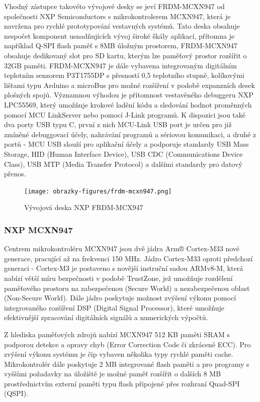 Vhodný zástupce takovéto vývojové desky se jeví FRDM-MCXN947 od společnosti NXP Semiconductors s mikrokontrolerem MCXN947, která je navržena pro rychlé prototypování vestavných systémů. Tato deska obsahuje nespočet komponent usnadňujících vývoj široké škály aplikací, přítomna je například Q-SPI flash paměť s 8MB úložným prostorem, FRDM-MCXN947 obsahuje dedikovaný slot pro SD kartu, kterým lze paměťový prostor rozšířit o 32GB paměti. FRDM-MCXN947 je dále vybavena integrovaným digitálním teplotním senzorem P3T1755DP s přesností 0,5 teplotního stupně, kolíkovými lištami typu Arduino a microBus pro možné rozšíření v podobě expanzních desek plošných spojů. Významnou výhodou je přítomnost vestavěného debuggeru NXP LPC55569, který umožňuje krokové ladění kódu a sledování hodnot proměnných pomocí MCU LinkServer nebo pomocí J-Link programů. K dispozici jsou také dva porty USB typu C, první z nich MCU-Link USB port je určen pro již zmíněné debuggovací účely, nahrávání programů a sériovou komunikaci, a druhé z portů - MCU USB slouží pro aplikační účely a podporuje standardy USB Mass Storage, HID (Human Interface Device), USB CDC (Communications Device Class), USB MTP (Media Transfer Protocol) a dalšími standardy pro datový přenos. \cite{nxp_MCX_Nx4x_Reference_Manual, nxp_FRDM_MCXN947_getting_started}

\begin{figure}[h]
    \centering
    \texttt{[image: obrazky-figures/frdm-mcxn947.png]}
    
    \caption{Vývojová deska NXP FRDM-MCX947 \cite{nxp_FRDM_MCXN947_getting_started}}
    \label{fig:keelog-airdrive-serial-datalogger}
\end{figure}

\subsubsection{NXP MCXN947}
Centrem mikrokontroléru MCXN947 jsou dvě jádra Arm® Cortex-M33 nové generace, pracující až na frekvenci 150 MHz. Jádro Cortex-M33 oproti předchozí generaci - Cortex-M3 je postaveno s novější instruční sadou ARMv8-M, která nabízí větší míru bezpečnosti v podobě TrustZone, jež umožňuje rozdělení paměťového prostoru na zabezpečenou (Secure World) a nezabezpečenou oblast (Non-Secure World). Dále jádro poskytuje možnost zvýšení výkonu pomocí integrovaného rozšíření DSP (Digital Signal Processor), které umožňuje efektivnější zpracování digitálních signálů a numerických výpočtů. \cite{nxp_MCX_Nx4x_Reference_Manual}

Z hlediska paměťových zdrojů nabízí MCXN947 512 KB paměti SRAM s podporou detekce a opravy chyb (Error Correction Code či zkráceně ECC). Pro zvýšení výkonu systému je čip vybaven několika typy rychlé paměti cache. Mikrokontrolér dále poskytuje 2 MB integrované flash paměti a pro programy s vyššími požadavky na úložiště je možné paměť rozšířit o dalších 8 MB prostřednictvím externí paměti typu flash připojené přes rozhraní Quad-SPI (QSPI). \cite{nxp_MCX_Nx4x_Reference_Manual}

